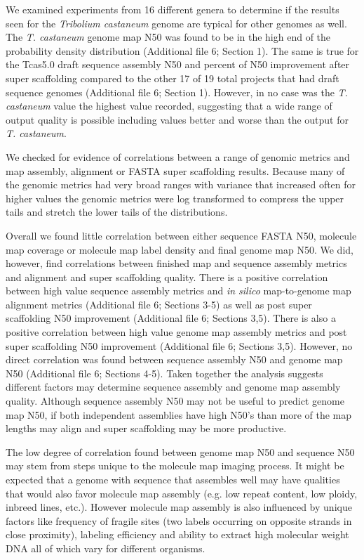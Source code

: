 \documentclass{bmcart}
\begin{document}
We examined experiments from 16 different genera to determine if the
results seen for the \textit{Tribolium castaneum} genome are typical for
other genomes as well. The \textit{T. castaneum} genome map N50 was found
to be in the high end of the probability density distribution
(Additional file 6; Section 1). The same is true for the Tcas5.0 draft
sequence assembly N50 and percent of N50 improvement after super
scaffolding compared to the other 17 of 19 total projects that had draft
sequence genomes (Additional file 6; Section 1). However, in no case was
the \textit{T. castaneum} value the highest value recorded, suggesting
that a wide range of output quality is possible including values better
and worse than the output for \textit{T. castaneum}.

We checked for evidence of correlations between a range of genomic
metrics and map assembly, alignment or FASTA super scaffolding results.
Because many of the genomic metrics had very broad ranges with variance
that increased often for higher values the genomic metrics were log
transformed to compress the upper tails and stretch the lower tails of
the distributions.

Overall we found little correlation between either sequence FASTA N50,
molecule map coverage or molecule map label density and final genome map
N50. We did, however, find correlations between finished map and
sequence assembly metrics and alignment and super scaffolding quality.
There is a positive correlation between high value sequence assembly
metrics and \textit{in silico} map-to-genome map alignment metrics
(Additional file 6; Sections 3-5) as well as post super scaffolding N50
improvement (Additional file 6; Sections 3,5). There is also a positive
correlation between high value genome map assembly metrics and post super scaffolding N50 improvement (Additional file 6;
Sections 3,5). However, no direct correlation was found between sequence
assembly N50 and genome map N50 (Additional file 6; Sections 4-5). Taken
together the analysis suggests different factors may determine sequence
assembly and genome map assembly quality. Although sequence assembly N50
may not be useful to predict genome map N50, if both independent
assemblies have high N50's than more of the map lengths may align and
super scaffolding may be more productive.

The low degree of correlation found between genome map N50 and sequence
N50 may stem from steps unique to the molecule map imaging process. It
might be expected that a genome with sequence that assembles well may
have qualities that would also favor molecule map assembly (e.g. low
repeat content, low ploidy, inbreed lines, etc.). However molecule map
assembly is also influenced by unique factors like frequency of fragile
sites (two labels occurring on opposite strands in close proximity),
labeling efficiency and ability to extract high molecular weight DNA all
of which vary for different organisms.
\end{document}
